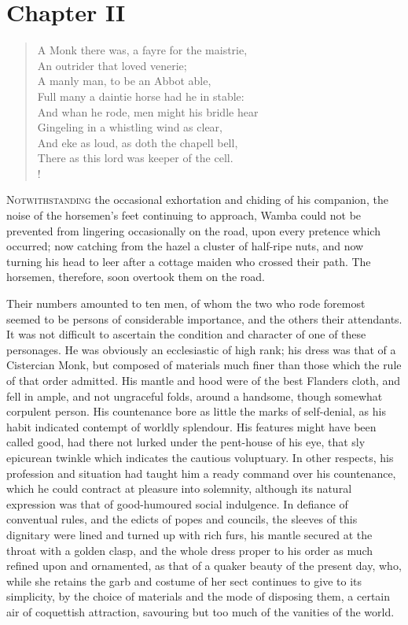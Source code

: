 \chapter{Chapter II}

\begin{verse}
A Monk there was, a fayre for the maistrie,\\
An outrider that loved venerie;\\
A manly man, to be an Abbot able,\\
Full many a daintie horse had he in stable:\\
And whan he rode, men might his bridle hear\\
Gingeling in a whistling wind as clear,\\
And eke as loud, as doth the chapell bell,\\
There as this lord was keeper of the cell.\\!
\end{verse}

\lettrine{N}{otwithstanding} the occasional exhortation and chiding of
his companion,
the noise of the horsemen's feet continuing to approach, Wamba could not
be prevented from lingering occasionally on the road, upon every
pretence which occurred; now catching from the hazel a cluster of
half-ripe nuts, and now turning his head to leer after a cottage maiden
who crossed their path. The horsemen, therefore, soon overtook them on
the road.

Their numbers amounted to ten men, of whom the two who rode foremost
seemed to be persons of considerable importance, and the others their
attendants. It was not difficult to ascertain the condition and
character of one of these personages. He was obviously an ecclesiastic
of high rank; his dress was that of a Cistercian Monk, but composed of
materials much finer than those which the rule of that order admitted.
His mantle and hood were of the best Flanders cloth, and fell in ample,
and not ungraceful folds, around a handsome, though somewhat corpulent
person. His countenance bore as little the marks of self-denial, as his
habit indicated contempt of worldly splendour. His features might have
been called good, had there not lurked under the pent-house of his eye,
that sly epicurean twinkle which indicates the cautious voluptuary. In
other respects, his profession and situation had taught him a ready
command over his countenance, which he could contract at pleasure into
solemnity, although its natural expression was that of good-humoured
social indulgence. In defiance of conventual rules, and the edicts of
popes and councils, the sleeves of this dignitary were lined and turned
up with rich furs, his mantle secured at the throat with a golden clasp,
and the whole dress proper to his order as much refined upon and
ornamented, as that of a quaker beauty of the present day, who, while
she retains the garb and costume of her sect continues to give to its
simplicity, by the choice of materials and the mode of disposing them, a
certain air of coquettish attraction, savouring but too much of the
vanities of the world.

